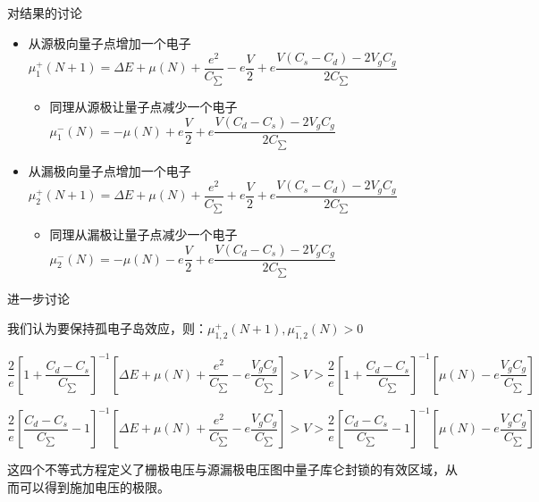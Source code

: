 \documentclass{beamer}[fontset=windows]
\begin{document}
        \begin{frame}
        \begin{block}{对结果的讨论}
        \begin{itemize}
        \item 从源极向量子点增加一个电子$\mu^{+}_{1}(N+1)=\Delta E+\mu(N)+\dfrac{e^{2}}{C_{\sum}}-e\dfrac{V}{2}+e\dfrac{V(C_{s}-C_{d})-2V_{g}C_{g}}{2C_{\sum}}$
        \begin{itemize}
        \item 同理从源极让量子点减少一个电子 $\mu^{-}_{1}(N)=-\mu(N)+e\dfrac{V}{2}+e\dfrac{V(C_{d}-C_{s})-2V_{g}C_{g}}{2C_{\sum}}$
        \end{itemize}
        \item 从漏极向量子点增加一个电子$\mu^{+}_{2}(N+1)=\Delta E+\mu(N)+\dfrac{e^{2}}{C_{\sum}}+e\dfrac{V}{2}+e\dfrac{V(C_{s}-C_{d})-2V_{g}C_{g}}{2C_{\sum}}$
                \begin{itemize}
                \item 同理从漏极让量子点减少一个电子 $\mu^{-}_{2}(N)=-\mu(N)-e\dfrac{V}{2}+e\dfrac{V(C_{d}-C_{s})-2V_{g}C_{g}}{2C_{\sum}}$
                \end{itemize}
        \end{itemize}
        \end{block}
        \end{frame}
    \begin{frame}
    \begin{block}{进一步讨论}
    \begin{itemize}
    \item 我们认为要保持孤电子岛效应，则：$\mu^{+}_{1,2}(N+1),\mu^{-}_{1,2}(N)>0$
    \small{\item $\dfrac{2}{e}[1+\dfrac{C_{d}-C_{s}}{C_{\sum}}]^{-1}[\Delta E+\mu(N)+\dfrac{e^{2}}{C_{\sum}}-e\dfrac{V_{g}C_{g}}{C_{\sum}}]>V>\dfrac{2}{e}[1+\dfrac{C_{d}-C_{s}}{C_{\sum}}]^{-1}[\mu(N)-e\dfrac{V_{g}C_{g}}{C_{\sum}}]$
    \item $\dfrac{2}{e}[\dfrac{C_{d}-C_{s}}{C_{\sum}}-1]^{-1}[\Delta E+\mu(N)+\dfrac{e^{2}}{C_{\sum}}-e\dfrac{V_{g}C_{g}}{C_{\sum}}]>V>\dfrac{2}{e}[\dfrac{C_{d}-C_{s}}{C_{\sum}}-1]^{-1}[\mu(N)-e\dfrac{V_{g}C_{g}}{C_{\sum}}]$}
    \item 这四个不等式方程定义了栅极电压与源漏极电压图中量子库仑封锁的有效区域，从而可以得到施加电压的极限。
    \end{itemize}
    \end{block}
    \end{frame}
\end{document}
